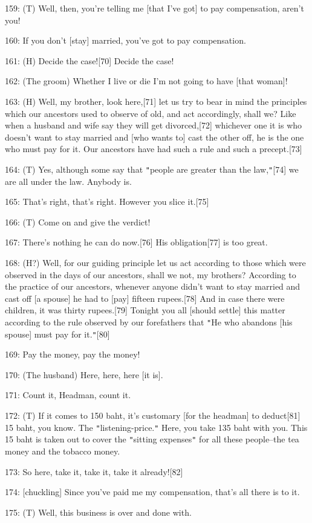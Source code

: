 159: (T) Well, then, you're telling me [that I've got] to pay compensation, aren't
you!

160: If you don't [stay] married, you've got to pay compensation.

161: (H) Decide the case![70] Decide the case!

162: (The groom) Whether I live or die I'm not going to have [that woman]!

163: (H) Well, my brother, look here,[71] let us try to bear in mind the principles
which our ancestors used to observe of old, and act accordingly, shall we? Like
when a husband and wife say they will get divorced,[72] whichever one it is who
doesn't want to stay married and [who wants to] cast the other off, he is the one
who must pay for it. Our ancestors have had such a rule and such a precept.[73]

164: (T) Yes, although some say that \texttt{"}people are greater than the law,\texttt{"}[74]
we are all under the law. Anybody is.

165: That's right, that's right. However you slice\textbf{ }it.[75]

166: (T) Come on and give the verdict!

167: There's nothing he can do now.[76] His obligation[77] is too great.

168: (H?) Well, for our guiding principle let us act according to those which were
observed in the days of our ancestors, shall we not, my brothers? According to
the practice of our ancestors, whenever anyone didn't want to stay married and
cast off [a spouse] he had to [pay] fifteen rupees.[78] And in case there were
children, it was thirty rupees.[79] Tonight you all [should settle] this matter
according to the rule observed by our forefathers that \texttt{"}He who abandons
[his spouse] must pay for it.\texttt{"}[80]

169: Pay the money, pay the money!

170: (The husband) Here, here, here [it is].

171: Count it, Headman, count it.

172: (T) If it comes to 150 baht, it's customary [for the headman] to deduct[81]
15 baht, you know. The \texttt{"}listening-price.\texttt{"} Here, you take 135
baht with you. This 15 baht is taken out to cover the \texttt{"}sitting expenses\texttt{"}
for all these people--the tea money and the tobacco money.

173: So here, take it, take it, take it already![82]

174: [chuckling] Since you've paid me my compensation, that's all there is to it.

175: (T) Well, this business is over and done with.

